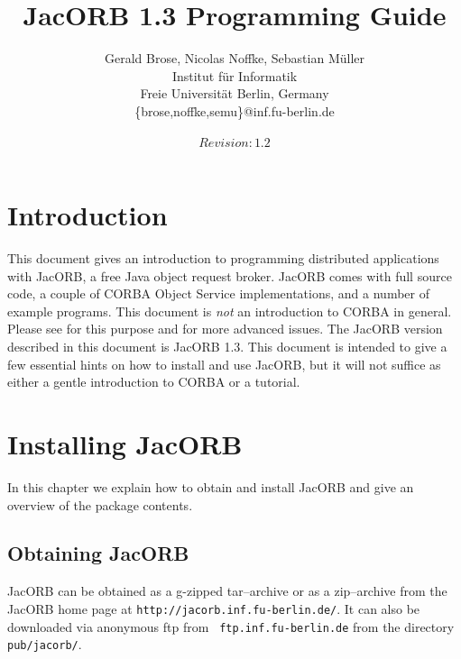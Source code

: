 \documentclass[12pt]{scrbook}
\title{JacORB 1.3 Programming Guide}
\author{Gerald Brose, Nicolas Noffke, Sebastian M\"uller\\
Institut f\"ur Informatik\\
Freie Universit\"at Berlin, Germany\\
\{brose,noffke,semu\}@inf.fu-berlin.de\\
\\
$Revision: 1.2 $
}
\begin{document}
\newcommand{\cmdline}[1]{\begin{small}\noindent \texttt{\$ #1}\end{small}}

\maketitle


\setlength{\parskip}{1.1ex}
\newpage
\tableofcontents

\chapter{Introduction}

This  document  gives   an  introduction  to  programming  distributed
applications with  JacORB, a free  Java object request  broker. JacORB
comes  with  full  source  code,  a couple  of  CORBA  Object  Service
implementations, and  a number of example programs.   This document is
{\it  not}   an  introduction  to   CORBA  in  general.    Please  see
\cite{Brose2001a,Siegel2000,   Vinoski1997}  for   this   purpose  and
\cite{Henning1999}  for  more  advanced  issues.  The  JacORB  version
described in this document is JacORB 1.3. This document is intended to
give a  few essential hints on how  to install and use  JacORB, but it
will  not  suffice as  either  a gentle  introduction  to  CORBA or  a
tutorial.


\chapter{Installing JacORB}
\label{Ch_installing}

In this chapter  we explain how to obtain and  install JacORB and give
an overview of the package contents.

\section{Obtaining JacORB}

JacORB can be obtained as a g-zipped tar--archive or as a zip--archive
from the  JacORB home page  at \verb+http://jacorb.inf.fu-berlin.de/+.
It   can   also   be   downloaded   via  anonymous   ftp   from   {\tt
ftp.inf.fu-berlin.de} from the directory {\tt pub/jacorb/}.
\end{document}
